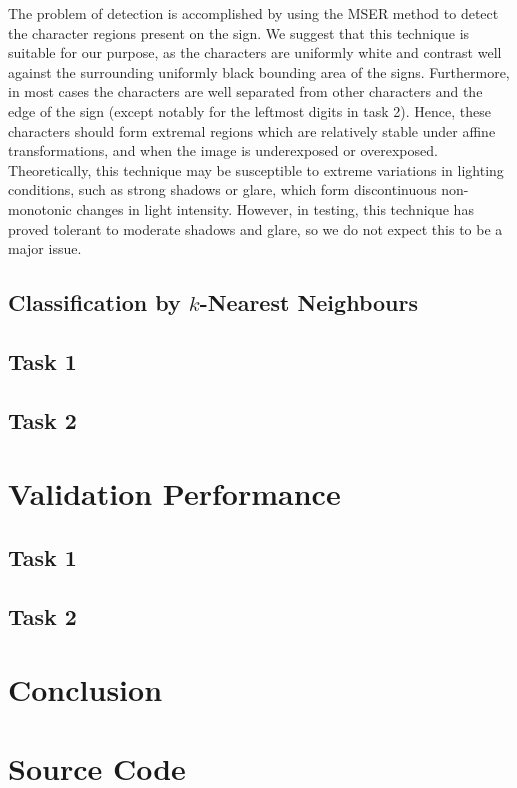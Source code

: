 \documentclass{article}
\begin{document}
The problem of detection is accomplished by using the MSER method to detect the
character regions present on the sign.
We suggest that this technique is suitable for our purpose, as the characters
are uniformly white and contrast well against the surrounding uniformly black
bounding area of the signs.
Furthermore, in most cases the characters are well separated from other
characters and the edge of the sign (except notably for the leftmost digits in
task 2).
Hence, these characters should form extremal regions which are relatively stable
under affine transformations, and when the image is underexposed or overexposed.
Theoretically, this technique may be susceptible to extreme variations in
lighting conditions, such as strong shadows or glare, which form discontinuous
non-monotonic changes in light intensity.
However, in testing, this technique has proved tolerant to moderate shadows and
glare, so we do not expect this to be a major issue.

\subsection{Classification by $k$-Nearest Neighbours}
\label{sec:imp-classification}

\subsection{Task 1}
\label{sec:imp-1}

\subsection{Task 2}
\label{sec:imp-2}

\section{Validation Performance}
\label{sec:val}

\subsection{Task 1}
\label{sec:val-1}

\subsection{Task 2}
\label{sec:val-2}

\section{Conclusion}
\label{sec:conclusion}

\clearpage



\appendix

\section{Source Code}
\label{sec:source-code}
\end{document}
